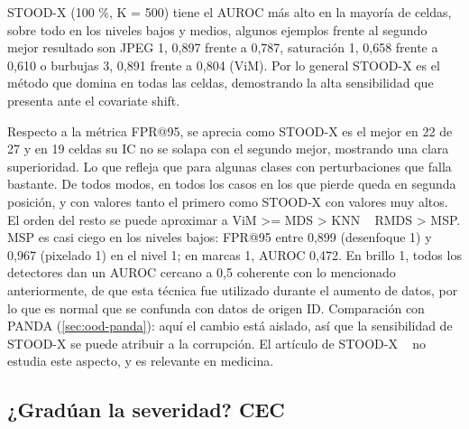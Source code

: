 STOOD-X (100 \%, K = 500) tiene el AUROC más alto en la mayoría de celdas, sobre
   todo en los niveles bajos y medios, algunos ejemplos frente al segundo mejor resultado son JPEG 1, 0,897 frente a 0,787,
   saturación 1, 0,658 frente a 0,610 o burbujas 3, 0,891 frente a 0,804 (ViM).
   Por lo general STOOD-X es el método que domina en todas las celdas, demostrando la alta sensibilidad que presenta ante 
   el covariate shift.
  
Respecto a la métrica FPR@95, se aprecia como STOOD-X es el mejor en 22 de 27 y en 19 celdas su IC no se solapa con el segundo mejor, mostrando una clara superioridad. Lo que refleja que para algunas clases con perturbaciones que falla bastante. De todos modos, en todos
   los casos en los que pierde queda en segunda posición, y con valores tanto el primero como STOOD-X con valores muy altos.
 El orden del resto se puede aproximar a ViM >= MDS > KNN ~ RMDS > MSP.
  MSP es casi ciego en los niveles bajos: FPR@95 entre 0,899 (desenfoque 1) y
   0,967 (pixelado 1) en el nivel 1; en marcas 1, AUROC 0,472.
  En brillo 1, todos los detectores dan un AUROC cercano a 0,5 coherente con lo mencionado anteriormente, de que esta técnica fue utilizado 
  durante el aumento de datos, por lo que es normal que se confunda con datos de origen ID.
  Comparación con PANDA (\cref{sec:ood-panda}): aquí el cambio está aislado, así que
  la sensibilidad de STOOD-X se puede atribuir a la corrupción. El artículo de STOOD-X ~\cite{sevillano2026} no estudia este
   aspecto, y es relevante en medicina.




\subsection{¿Gradúan la severidad? CEC}\label{sec:ood-corr-cec}



